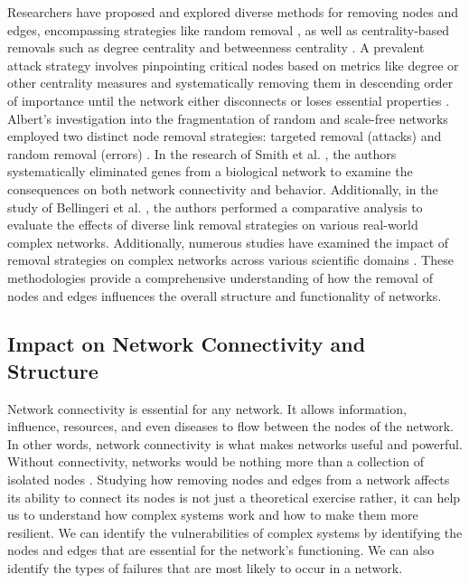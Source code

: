 \documentclass[conference]{IEEEtran} %
\begin{document}
Researchers have proposed and explored diverse methods for removing nodes and edges, encompassing strategies like random removal \cite{albert2000error, albert2002statistical}, as well as centrality-based removals such as degree centrality and betweenness centrality \cite{wandelt2018comparative, inbook}. A prevalent attack strategy involves pinpointing critical nodes based on metrics like degree or other centrality measures and systematically removing them in descending order of importance until the network either disconnects or loses essential properties \cite{holme2002attack}. Albert's investigation into the fragmentation of random and scale-free networks employed two distinct node removal strategies: targeted removal (attacks) and random removal (errors) \cite{albert2000error}. In the research of Smith et al. \cite{smith2015edge}, the authors systematically eliminated genes from a biological network to examine the consequences on both network connectivity and behavior. Additionally, in the study of Bellingeri et al. \cite{bellingeri2020comparative}, the authors performed a comparative analysis to evaluate the effects of diverse link removal strategies on various real-world complex networks. Additionally, numerous studies have examined the impact of removal strategies on complex networks across various scientific domains \cite{latora2001efficient, yang2017small, caldu2018structural, gallos2005stability, zanin2013modelling,dorpinghaus2022centrality}. These methodologies provide a comprehensive understanding of how the removal of nodes and edges influences the overall structure and functionality of networks.

\subsection{Impact on Network Connectivity and Structure}

Network connectivity is essential for any network. It allows information, influence, resources, and even diseases to flow between the nodes of the network. In other words, network connectivity is what makes networks useful and powerful. Without connectivity, networks would be nothing more than a collection of isolated nodes \cite{newman2010networks}. Studying how removing nodes and edges from a network affects its ability to connect its nodes is not just a theoretical exercise rather, it can help us to understand how complex systems work and how to make them more resilient. We can identify the vulnerabilities of complex systems by identifying the nodes and edges that are essential for the network's functioning. We can also identify the types of failures that are most likely to occur in a network. 
\end{document}
